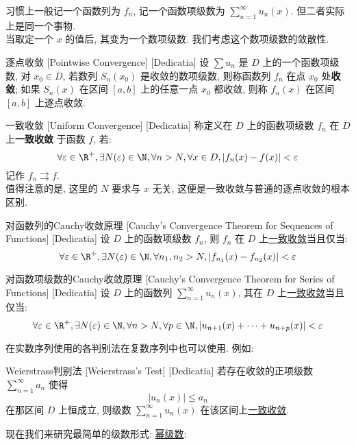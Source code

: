 \documentclass[UTF8]{ctexart}
\newcommand{\PowerSeries}{\hyperref[dfn:PowerSeries]{幂级数}}
\newcommand{\UniformConvergence}{\hyperref[dfn:UniformConvergence]{一致收敛}}
\begin{document}
习惯上一般记一个函数列为 \( f_n \), 记一个函数项级数为 \( \sum_{n = 1}^{\infty} u_n(x)  \). 但二者实际上是同一个事物. \\
当取定一个 \( x \) 的值后, 其变为一个数项级数. 我们考虑这个数项级数的敛散性. 
\begin{dfn}
    [UUID]
    {逐点收敛}
    [Pointwise Convergence]
    [Dedicatia]
    设 \(\sum u_n\) 是 \(D\) 上的一个函数项级数, 对 \(x_0\in D\), 若数列 \(S_n(x_0)\) 是收敛的数项级数, 则称函数列 \(f_n\) 在点 \(x_0\) 处\textbf{收敛}; 如果 \( S_n(x) \) 在区间 \( [a,b] \) 上的任意一点 \( x_0 \) 都收敛, 则称 \( f_n(x) \) 在区间 \( [a,b] \) 上逐点收敛. 
\end{dfn}
\begin{dfn}
    [UniformConvergence]
    {一致收敛}
    [Uniform Convergence]
    [Dedicatia]
    称定义在 \(D\) 上的函数项级数 \(f_n\) 在 \(D\) 上\textbf{一致收敛} 于函数 \(f\), 若: 
    \[\forall\varepsilon\in\R^+, \exists N(\varepsilon)\in\N, \forall n>N, \forall x\in D, |f_n(x)-f(x)|<\varepsilon\]
    记作 \( f_n\rightrightarrows f \).\\
    值得注意的是, 这里的 \( N \) 要求与 \( x \) 无关, 这便是一致收敛与普通的逐点收敛的根本区别. 
\end{dfn}
\begin{crl}
    [UUID]
    {对函数列的Cauchy收敛原理}
    [Cauchy's Convergence Theorem for Sequences of Functions]
    [Dedicatia]
    设 \(D\) 上的函数项级数 \(f_n\), 则 \(f_n\) 在 \(D\) 上\UniformConvergence 当且仅当: 
	\[\forall\varepsilon\in\R^+, \exists N(\varepsilon)\in\N, \forall n_1,n_2>N, |f_{n_1}(x)-f_{n_2}(x)|<\varepsilon\]
\end{crl}
\begin{crl}
    [UUID]
    {对函数项级数的Cauchy收敛原理}
    [Cauchy's Convergence Theorem for Series of Functions]
    [Dedicatia]
    设 \(D\) 上的函数列 \(\sum_{n=1}^{\infty} u_n(x)\), 其在 \(D\) 上\UniformConvergence 当且仅当: 
	\[\forall\varepsilon\in\R^+, \exists N(\varepsilon)\in\N, \forall n>N, \forall p\in\N, |u_{n+1}(x)+\cdots+u_{n+p}(x)|<\varepsilon\]
\end{crl}
在实数序列使用的各判别法在复数序列中也可以使用. 例如: 
\begin{thm}
    [UUID]
    {Weierstrass判别法}
    [Weierstrass's Test]
    [Dedicatia]
    若存在收敛的正项级数 \( \sum_{n = 1}^{\infty} a_n  \) 使得\[|u_n(x)|\leqslant a_n\]
    在那区间 \( D \) 上恒成立, 则级数 \( \sum_{n = 1}^{\infty} u_n(x)  \) 在该区间上\UniformConvergence. 
\end{thm}
现在我们来研究最简单的级数形式: \PowerSeries : 
\end{document}
